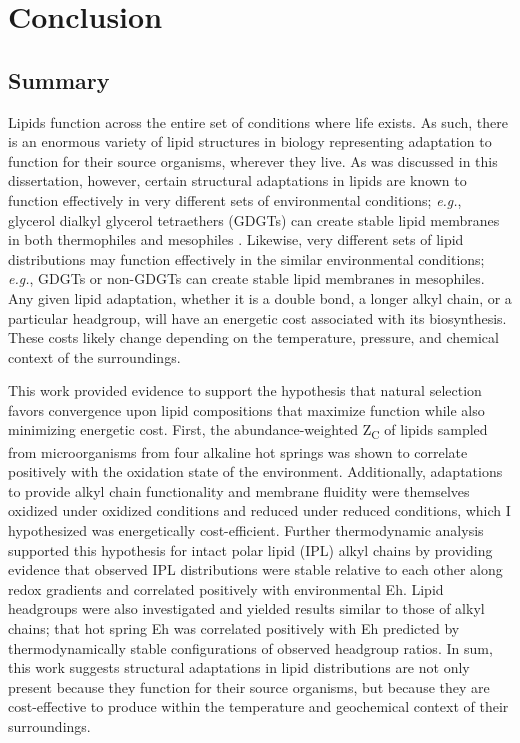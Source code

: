 \chapter[CONCLUSION]{Conclusion}

\section{Summary}

Lipids function across the entire set of conditions where life exists. As such, there is an enormous variety of lipid structures in biology representing adaptation to function for their source organisms, wherever they live. As was discussed in this dissertation, however, certain structural adaptations in lipids are known to function effectively in very different sets of environmental conditions; \textit{e.g.}, glycerol dialkyl glycerol tetraethers (GDGTs) can create stable lipid membranes in both thermophiles and mesophiles \citep{schouten2000widespread}. Likewise, very different sets of lipid distributions may function effectively in the similar environmental conditions; \textit{e.g.}, GDGTs or non-GDGTs can create stable lipid membranes in mesophiles. Any given lipid adaptation, whether it is a double bond, a longer alkyl chain, or a particular headgroup, will have an energetic cost associated with its biosynthesis. These costs likely change depending on the temperature, pressure, and chemical context of the surroundings.

This work provided evidence to support the hypothesis that natural selection favors convergence upon lipid compositions that maximize function while also minimizing energetic cost. First, the abundance-weighted Z\textsubscript{C} of lipids sampled from microorganisms from four alkaline hot springs was shown to correlate positively with the oxidation state of the environment. Additionally, adaptations to provide alkyl chain functionality and membrane fluidity were themselves oxidized under oxidized conditions and reduced under reduced conditions, which I hypothesized was energetically cost-efficient. Further thermodynamic analysis supported this hypothesis for intact polar lipid (IPL) alkyl chains by providing evidence that observed IPL distributions were stable relative to each other along redox gradients and correlated positively with environmental Eh. Lipid headgroups were also investigated and yielded results similar to those of alkyl chains; that hot spring Eh was correlated positively with Eh predicted by thermodynamically stable configurations of observed headgroup ratios. In sum, this work suggests structural adaptations in lipid distributions are not only present because they function for their source organisms, but because they are cost-effective to produce within the temperature and geochemical context of their surroundings.

